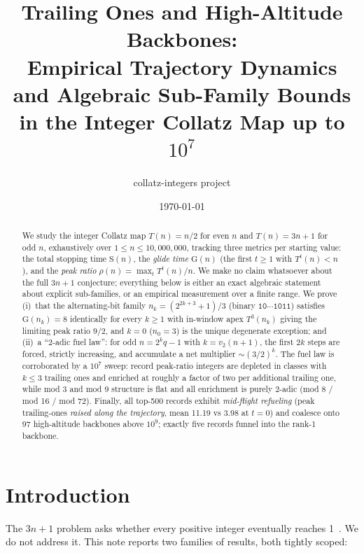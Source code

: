 \documentclass[11pt]{article}
\title{Trailing Ones and High-Altitude Backbones:\\
 Empirical Trajectory Dynamics and Algebraic Sub-Family Bounds\\
 in the Integer Collatz Map up to $10^{7}$}
\author{collatz-integers project}
\date{\today}
\theoremstyle{remark}
\newcommand{\T}{T}
\newcommand{\vtwo}{v_2}
\begin{document}
\maketitle

\begin{abstract}
We study the integer Collatz map $\T(n) = n/2$ for even $n$ and
$\T(n) = 3n+1$ for odd $n$, exhaustively over $1 \le n \le 10{,}000{,}000$,
tracking three metrics per starting value: the total stopping time
$\mathrm{S}(n)$, the \emph{glide time} $\mathrm{G}(n)$ (the first $t \ge 1$
with $\T^t(n) < n$), and the \emph{peak ratio} $\rho(n) =
\max_t \T^t(n)/n$. We make no claim whatsoever about the full $3n+1$
conjecture; everything below is either an exact algebraic statement about
explicit sub-families, or an empirical measurement over a finite range.
We prove (i)~that the alternating-bit family $n_k = (2^{2k+3}+1)/3$
(binary $\texttt{10}\cdots\texttt{1011}$) satisfies $\mathrm{G}(n_k) = 8$
identically for every $k \ge 1$ with in-window apex $\T^3(n_k)$ giving the
limiting peak ratio $9/2$, and $k = 0$ ($n_0 = 3$) is the unique degenerate
exception; and (ii)~a ``2-adic fuel law'': for odd $n = 2^k q - 1$ with
$k = \vtwo(n+1)$, the first $2k$ steps are forced, strictly increasing, and
accumulate a net multiplier $\sim (3/2)^k$. The fuel law is corroborated by
a $10^7$ sweep: record peak-ratio integers are depleted in classes with
$k \le 3$ trailing ones and enriched at roughly a factor of two per
additional trailing one, while mod 3 and mod 9 structure is flat and all
enrichment is purely 2-adic (mod 8 / mod 16 / mod 72). Finally, all
top-500 records exhibit \emph{mid-flight refueling} (peak trailing-ones
\emph{raised along the trajectory}, mean 11.19 vs $3.98$ at $t=0$) and
coalesce onto 97 high-altitude backbones above $10^9$; exactly five records
funnel into the rank-1 backbone.
\end{abstract}

\section{Introduction}
The $3n+1$ problem asks whether every positive integer eventually reaches
1~\cite{lagarias2010,teras1976}. We do not address it. This note reports
two families of results, both tightly scoped:
\end{document}
